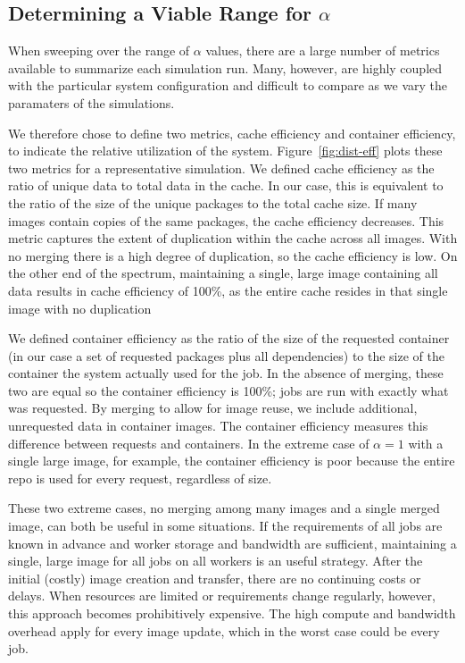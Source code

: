 \documentclass[sigconf]{acmart}
\begin{document}
\subsection{Determining a Viable Range for $\alpha$}

When sweeping over the range of $\alpha$ values,
there are a large number of metrics available to summarize each simulation run.
Many, however, are highly coupled with the particular system configuration and difficult to compare as we vary the paramaters of the simulations.

We therefore chose to define two metrics, cache efficiency and container efficiency,
to indicate the relative utilization of the system.
Figure~\ref{fig:dist-eff} plots these two metrics for a representative simulation.
We defined cache efficiency as the ratio of unique data to total data in the cache.
In our case, this is equivalent to the ratio of the size of the unique packages to the total cache size.
If many images contain copies of the same packages,
the cache efficiency decreases.
This metric captures the extent of duplication within the cache across all images.
With no merging there is a high degree of duplication,
so the cache efficiency is low.
On the other end of the spectrum,
maintaining a single, large image containing all data results in cache efficiency of 100\%,
as the entire cache resides in that single image with no duplication

We defined container efficiency as the ratio of the size of the requested container
(in our case a set of requested packages plus all dependencies)
to the size of the container the system actually used for the job.
In the absence of merging,
these two are equal so the container efficiency is 100\%;
jobs are run with exactly what was requested.
By merging to allow for image reuse,
we include additional, unrequested data in container images.
The container efficiency measures this difference between requests and containers.
In the extreme case of $\alpha=1$ with a single large image, for example,
the container efficiency is poor because the entire repo is used for every request,
regardless of size.

These two extreme cases, no merging among many images and a single merged image,
can both be useful in some situations.
If the requirements of all jobs are known in advance and worker storage and bandwidth are sufficient,
maintaining a single, large image for all jobs on all workers is an useful strategy.
After the initial (costly) image creation and transfer,
there are no continuing costs or delays.
When resources are limited or requirements change regularly,
however, this approach becomes prohibitively expensive.
The high compute and bandwidth overhead apply for every image update,
which in the worst case could be every job.
\end{document}
